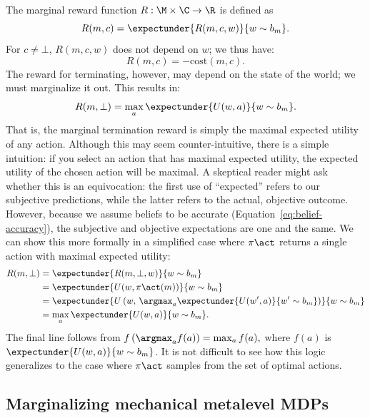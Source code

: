 The marginal reward function $R: \M \times \C \rightarrow \R$ is defined as
%
\begin{equation}
R(m, c) = \expectunder{R(m, c, w)}{w \sim b_m}.
\end{equation}
%
For $c \neq \bot$, $R(m, c, w)$ does not depend on $w$; we thus have:
%
\begin{equation}
  R(m, c) = -\text{cost}(m, c).
\end{equation}
The reward for terminating, however, may depend on the state of the world; we must marginalize it out. This results in:
%
\begin{equation}\label{eq:marginal-term}
  R(m, \bot) = \max_a \expectunder{U(w, a)}{w \sim b_m}.
\end{equation}
%
That is, the marginal termination reward is simply the maximal expected utility of any action. Although this may seem counter-intuitive, there is a simple intuition: if you select an action that has maximal expected utility, the expected utility of the chosen action will be maximal. A skeptical reader might ask whether this is an equivocation: the first use of ``expected'' refers to our subjective predictions, while the latter refers to the actual, objective outcome. However, because we assume beliefs to be accurate (Equation~\ref{eq:belief-accuracy}), the subjective and objective expectations are one and the same. We can show this more formally in a simplified case where $\pi\act$ returns a single action with maximal expected utility:
\begin{equation}\label{eq:Rbot-derivation}
\begin{aligned}
R(m, \bot)
&= \expectunder{R(m, \bot, w)}{w \sim b_m} \\
&= \expectunder{U(w, \pi\act(m))}{w \sim b_m} \\
&= \expectunder{U\left(w,\, \argmax_a \expectunder{U(w', a)}{w' \sim b_m}\right)}{w \sim b_m} \\
&= \max_a \expectunder{U(w, a)}{w \sim b_m}
.
\end{aligned}
\end{equation}
%
The final line follows from
%
\begin{math}
  f\left(\argmax_a f(a)\right) = \max_a f(a)
  ,
\end{math}
%
where $f(a)$ is $\expectunder{U(w, a)}{w \sim b_m}$. It is not difficult to see how this logic generalizes to the case where $\pi\act$ samples from the set of optimal actions.

\subsection{Marginalizing mechanical metalevel MDPs}\label{sec:marginal-mechanical}

